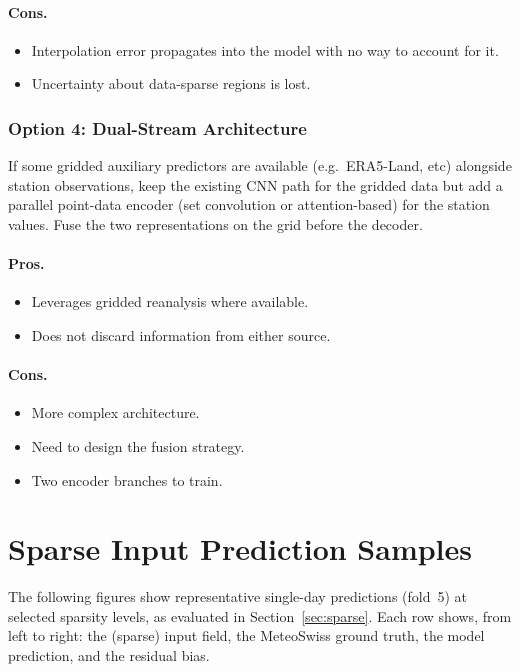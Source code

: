 \paragraph{Cons.}
\begin{itemize}
    \item Interpolation error propagates into the model with no way to account for it.
    \item Uncertainty about data-sparse regions is lost.
\end{itemize}

\subsubsection{Option 4: Dual-Stream Architecture}

If some gridded auxiliary predictors are available (e.g.\ ERA5-Land, etc) alongside station observations, keep the existing CNN path for the gridded data but add a parallel point-data encoder (set convolution or attention-based) for the station values. Fuse the two representations on the grid before the decoder.

\paragraph{Pros.}
\begin{itemize}
    \item Leverages gridded reanalysis where available.
    \item Does not discard information from either source.
\end{itemize}

\paragraph{Cons.}
\begin{itemize}
    \item More complex architecture.
    \item Need to design the fusion strategy.
    \item Two encoder branches to train.
\end{itemize}


\section{Sparse Input Prediction Samples}
\label{sec:sparse_predictions}

The following figures show representative single-day predictions (fold~5) at selected sparsity levels, as evaluated in Section~\ref{sec:sparse}. Each row shows, from left to right: the (sparse) input field, the MeteoSwiss ground truth, the model prediction, and the residual bias.

